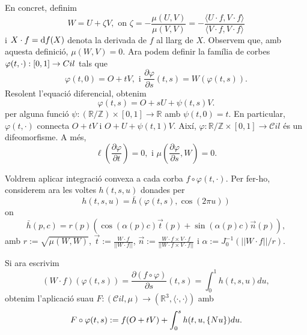 En concret, definim 
\begin{equation}
    W=U+\zeta V, \text{ on } \zeta = -\frac{\mu(U,V)}{\mu(V,V)} = -\frac{\langle U\cdot f, V\cdot f\rangle}{\langle V\cdot f, V\cdot f\rangle}
\end{equation}
i $X\cdot f = \text df(X)$ denota la derivada de $f$ al llarg de $X$. Observem que, amb aquesta definició, $\mu(W,V)=0$. Ara podem definir la família de corbes $\varphi(t,\cdot):[0,1]\to\mathbb \mathcal Cil$ tals que 
\begin{equation}
    \varphi(t,0) = O + tV, \text{ i } \frac{\partial\varphi}{\partial s}(t,s) = W(\varphi(t,s)).
\end{equation}
Resolent l'equació diferencial, obtenim
\begin{equation}
    \varphi(t,s) = O + sU + \psi(t,s)V.
\end{equation}
per alguna funció $\psi:(\mathbb R/\mathbb Z)\times[0,1]\to\mathbb R$ amb $\psi(t,0)=t$. En particular, $\varphi(t,\cdot)$ connecta $O+tV$ i $O+U+\psi(t,1)V$. Així, $\varphi:\mathbb R/\mathbb Z\times[0,1]\to\mathcal Cil$ és un difeomorfisme. A més, 
\begin{equation}
    \ell\left( \frac{\partial\varphi}{\partial t} \right) = 0, \text{ i } \mu\left( \frac{\partial\varphi}{\partial s}, W \right) = 0.
\end{equation}

Voldrem aplicar integració convexa a cada corba $f\circ\varphi(t,\cdot)$. Per fer-ho, considerem ara les voltes $h(t,s,u)$ donades per
\begin{equation}
    h(t,s,u) = \bar h(\varphi(t,s), \cos(2\pi u))
\end{equation}
on 
\begin{equation*}
    \bar h(p, c) = r(p)\left( \cos(\alpha(p)c)\vec t(p) + \sin(\alpha(p)c)\vec n(p) \right),
\end{equation*}
amb $r:=\sqrt{\mu(W,W)}$, $\vec t := \frac{W\cdot f}{||W\cdot f||}$, $\vec n := \frac{W\cdot f\times V\cdot f}{||W\cdot f\times V\cdot f||}$ i $\alpha:= J_0^{-1}(||W\cdot f||/r)$.

Si ara escrivim 
\begin{equation*}
    (W\cdot f)(\varphi(t,s)) = \frac{\partial(f\circ\varphi)}{\partial s}(t,s)= \int_0^1 h(t,s,u) du,
\end{equation*}
obtenim l'aplicació suau $F:(\mathcal Cil, \mu)\to(\mathbb R^3, \langle\cdot, \cdot\rangle)$ amb
\begin{equation}
    F\circ\varphi(t,s) := f(O+tV) + \int_0^s h(t,u,\{Nu\}) du.
\end{equation}

